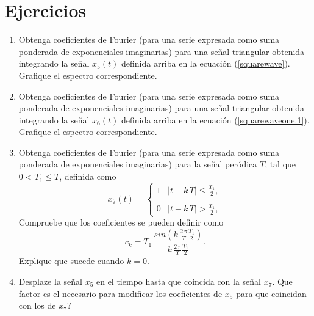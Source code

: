 \section{Ejercicios}


\begin{enumerate}
\item Obtenga coeficientes de Fourier (para una serie expresada como suma ponderada de exponenciales imaginarias) 
para una se\~{n}al triangular obtenida integrando la se\~{n}al $x_{5}(t)$ definida arriba en la ecuaci\'{o}n (\ref{squarewave}). 
Grafique el espectro correspondiente.

\item Obtenga coeficientes de Fourier (para una serie expresada como suma ponderada de exponenciales imaginarias) 
para una se\~{n}al triangular obtenida integrando la se\~{n}al $x_{6}(t)$ definida arriba en la ecuaci\'{o}n (\ref{squarewaveone.1}). 
Grafique el espectro correspondiente.

\item Obtenga coeficientes de Fourier (para una serie expresada como suma ponderada de exponenciales imaginarias) 
para la se\~{n}al per\'{o}dica $T$, tal que $0 < T_{1} \leq T$, definida como
\begin{equation}
x_{7}(t) = \left\{\begin{array}{cc}
  1 & |t - k \, T| \leq \frac{T_{1}}{2}, \\
    & \\
  0 & |t - k \, T| > \frac{T_{1}}{2},
\end{array} \right.
\end{equation}
Compruebe que los coeficientes se pueden definir como
\begin{equation}
c_{k} = T_{1} \, \frac{sin(k \, \frac{2 \, \pi}{T} \frac{T_{1}}{2})}{k \, \frac{2 \, \pi}{T} \frac{T_{1}}{2}}.
\end{equation}
Explique que sucede cuando $k = 0$.
\item Desplaze la se\~{n}al $x_{5}$ en el tiempo hasta que coincida con la se\~{n}al $x_{7}$. \textquestiondown Que factor es el necesario para modificar los coeficientes de $x_{5}$ para que coincidan con los de $x_{7}$?
\end{enumerate}

